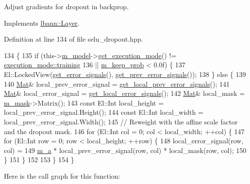 Adjust gradients for dropout in backprop. 

Implements \hyperlink{classlbann_1_1Layer_a7442e01f9ee1294df2de811efcf5171e}{lbann\+::\+Layer}.



Definition at line 134 of file selu\+\_\+dropout.\+hpp.


\begin{DoxyCode}
134                              \{
135     \textcolor{keywordflow}{if} (this->\hyperlink{classlbann_1_1Layer_a3d9315e99574166f2f33e37b572021d2}{m\_model}->\hyperlink{classlbann_1_1model_addb40597cf29aa6d31b6a7d09ef48608}{get\_execution\_mode}() != 
      \hyperlink{base_8hpp_a2781a159088df64ed7d47cc91c4dc0a8ac185ddac8b5a8f5aa23c5b80bc12d214}{execution\_mode::training}
136         || \hyperlink{classlbann_1_1selu__dropout_a00bd2a07703e2e918af8ae68b58ff11b}{m\_keep\_prob} < 0.0f) \{
137       El::LockedView(\hyperlink{classlbann_1_1Layer_adb561e140e0bb601f3c5a8ee053a71d2}{get\_error\_signals}(), 
      \hyperlink{classlbann_1_1Layer_a7ac4579d3c1671dfaf86e3b618d6938a}{get\_prev\_error\_signals}());
138     \} \textcolor{keywordflow}{else} \{
139 
140       \hyperlink{base_8hpp_a68f11fdc31b62516cb310831bbe54d73}{Mat}& local\_prev\_error\_signal = \hyperlink{classlbann_1_1Layer_a82827edc5e869960144f3ccb2172bfcd}{get\_local\_prev\_error\_signals}();
141       \hyperlink{base_8hpp_a68f11fdc31b62516cb310831bbe54d73}{Mat}& local\_error\_signal = \hyperlink{classlbann_1_1Layer_af178d00b9d878aa7d87754bff2a91f3a}{get\_local\_error\_signals}();
142       \hyperlink{base_8hpp_a68f11fdc31b62516cb310831bbe54d73}{Mat}& local\_mask = \hyperlink{classlbann_1_1selu__dropout_a31aaadbc51d78673a84390b48d4e5950}{m\_mask}->Matrix();
143       \textcolor{keyword}{const} El::Int local\_height = local\_prev\_error\_signal.Height();
144       \textcolor{keyword}{const} El::Int local\_width = local\_prev\_error\_signal.Width();
145       \textcolor{comment}{// Reweight with the affine scale factor and the dropout mask.}
146       \textcolor{keywordflow}{for} (El::Int col = 0; col < local\_width; ++col) \{
147         \textcolor{keywordflow}{for} (El::Int row = 0; row < local\_height; ++row) \{
148           local\_error\_signal(row, col) =
149             \hyperlink{classlbann_1_1selu__dropout_a52bd21583da68ba4e8a374fab259a3ef}{m\_a} * local\_prev\_error\_signal(row, col) * local\_mask(row, col);
150         \}
151       \}
152 
153     \}
154   \}
\end{DoxyCode}
Here is the call graph for this function\+:\nopagebreak
